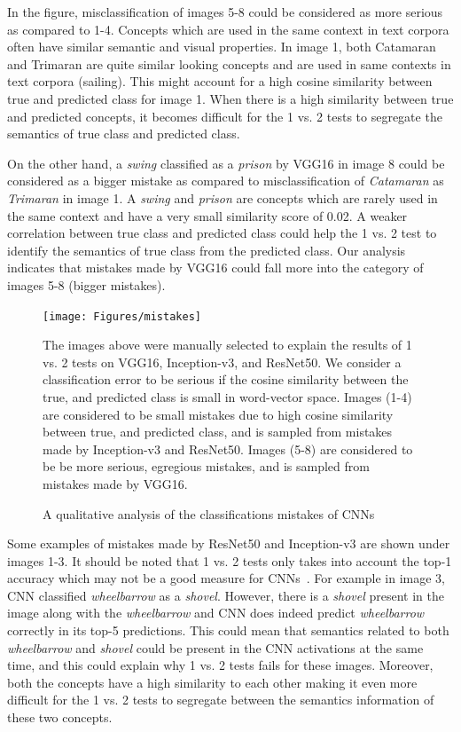 In the figure, misclassification of images 5-8 could be considered as more serious as compared to 1-4. Concepts which are used in the same context in text corpora often have similar semantic and visual properties. In image 1, both Catamaran and Trimaran are quite similar looking concepts and are used in same contexts in text corpora (sailing). This might account for a high cosine similarity between true and predicted class for image 1. When there is a high similarity between true and predicted concepts, it becomes difficult for the 1 vs. 2 tests to segregate the semantics of true class and predicted class. 



On the other hand, a \textit{swing} classified as a \textit{prison} by VGG16 in image 8 could be considered as a bigger mistake as compared to misclassification of \textit{Catamaran} as \textit{Trimaran} in image 1. A \textit{swing} and \textit{prison} are concepts which are rarely used in the same context and have a very small similarity score of 0.02. A weaker correlation between true class and predicted class could help the 1 vs. 2 test to identify the semantics of true class from the predicted class. Our analysis indicates that mistakes made by VGG16 could fall more into the category of images 5-8 (bigger mistakes). 

\begin{figure}[!hb]
\centering
\texttt{[image: Figures/mistakes]}
\caption{A qualitative analysis of the classifications mistakes of CNNs}
\label{Mistakes}
The images above were manually selected to explain the  results of 1 vs. 2 tests on VGG16, Inception-v3, and ResNet50. We consider a classification error to be serious if the cosine similarity between the true, and predicted class is small in word-vector space. Images (1-4) are considered to be small mistakes due to high cosine similarity between true, and predicted class, and is sampled from mistakes made by Inception-v3 and ResNet50. Images (5-8) are considered to be be more serious, egregious mistakes, and is sampled from mistakes made by VGG16. 

\end{figure}

Some examples of mistakes made by ResNet50 and Inception-v3 are shown under images 1-3. It should be noted that 1 vs. 2 tests only takes into account the top-1 accuracy which may not be a good measure for CNNs~\cite{ImageNETChallenge}. For example in image 3, CNN classified \textit{wheelbarrow} as a \textit{shovel}. However, there is a \textit{shovel} present in the image along with the \textit{wheelbarrow} and CNN does indeed predict \textit{wheelbarrow} correctly in its top-5 predictions. This could mean that semantics related to both \textit{wheelbarrow} and \textit{shovel} could be present in the CNN activations at the same time, and this could explain why 1 vs. 2 tests fails for these images. Moreover, both the concepts have a high similarity to each other making it even more difficult for the 1 vs. 2 tests to segregate between the semantics information of these two concepts. 

